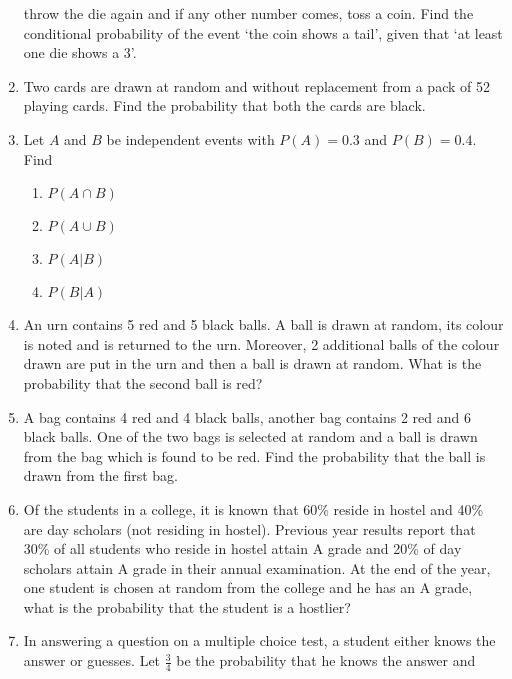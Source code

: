 \begin{enumerate}[label=\thesubsection.\arabic*,ref=\thesubsection.\theenumi]
    throw the die again and if any other number comes, toss a coin. Find the 
    conditional probability of the event `the coin shows a tail', given that `at 
    least one die shows a 3'.
\\
\solution
%
%
\item Two cards are drawn at random and without replacement from a pack of 52 playing cards. Find the probability that both the cards are black.\\
\solution
%
%
\item Let $A$ and $B$ be independent events with $P(A)=0.3$ and $P(B)=0.4$. Find
		\label{ncert/12/13/2/7}
\begin{enumerate}
\item $P(A \cap B)$
\item $P(A \cup B)$
\item $P(A|B)$
\item $P(B|A)$
\end{enumerate}
%
\item An urn contains 5 red and 5 black balls. A ball is drawn at random, its colour is
noted and is returned to the urn. Moreover, 2 additional balls of the colour drawn
are put in the urn and then a ball is drawn at random. What is the probability that
the second ball is red?
		\label{ncert/12/13/3/1}
\\
\solution
%
\item A bag contains 4 red and 4 black balls, another bag contains 2 red and 6 black
balls. One of the two bags is selected at random and a ball is drawn from the bag
which is found to be red. Find the probability that the ball is drawn from the
first bag.
		\label{ncert/12/13/3/2}
\item Of the students in a college, it is known that 60\% reside in hostel and 40\% are
day scholars (not residing in hostel). Previous year results report that 30\% of all
students who reside in hostel attain A grade and 20\% of day scholars attain A
grade in their annual examination. At the end of the year, one student is chosen
at random from the college and he has an A grade, what is the probability that the
student is a hostlier?     
		\label{ncert/12/13/3/3}
\\
\solution
%
\item In answering a question on a multiple choice test, a student either knows the
answer or guesses. Let
$\frac{3}{4}$ be the probability that he knows the answer and

\end{enumerate}
